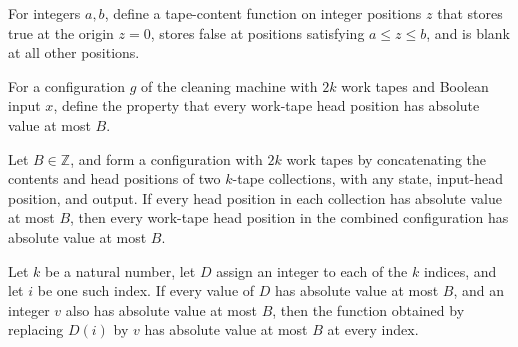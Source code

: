 \begin{definition}
\label{Complexity.LogProg.markI}
\leanok
For integers $a,b$, define a tape-content function on integer positions $z$ that stores
true at the origin $z=0$, stores false at positions satisfying $a\le z\le b$, and is
blank at all other positions.
\end{definition}

\begin{definition}
\label{Complexity.LogProg.PB}
\leanok
{}
For a configuration $g$ of the cleaning machine with $2k$ work tapes and Boolean input
$x$, define the property that every work-tape head position has absolute value at most
$B$.
\end{definition}

\begin{lemma}
\label{Complexity.LogProg.PB_ccfg}
\leanok
{}
Let $B\in\mathbb{Z}$, and form a configuration with $2k$ work tapes by concatenating the
contents and head positions of two $k$-tape collections, with any state, input-head
position, and output. If every head position in each collection has absolute value at
most $B$, then every work-tape head position in the combined configuration has absolute
value at most $B$.
\end{lemma}

\begin{lemma}
\label{Complexity.LogProg.abs_update_le}
\leanok
{}
Let $k$ be a natural number, let $D$ assign an integer to each of the $k$ indices, and
let $i$ be one such index. If every value of $D$ has absolute value at most $B$, and an
integer $v$ also has absolute value at most $B$, then the function obtained by replacing
$D(i)$ by $v$ has absolute value at most $B$ at every index.
\end{lemma}

